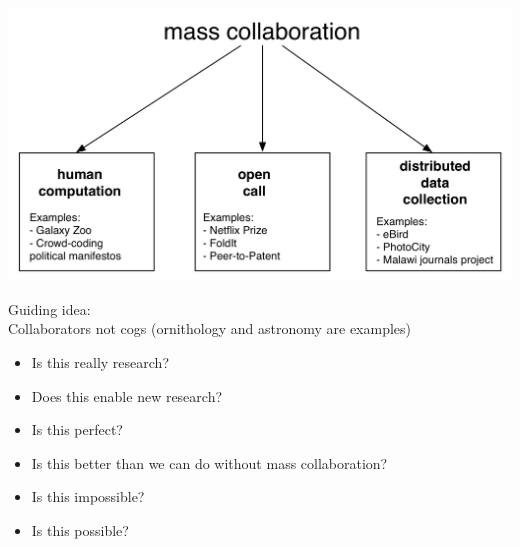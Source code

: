 \documentclass[aspectratio=169]{beamer}
\begin{document}
\begin{frame}

\begin{center}
\includegraphics[width=\textwidth]{figures/mass_collaboration_schematic}
\end{center}

\end{frame}
\begin{frame}

Guiding idea:\\
Collaborators not cogs (ornithology and astronomy are examples)

\end{frame}
\begin{frame}

\begin{itemize}
\item Is this really research?
\pause 
\item Does this enable new research?
\end{itemize}

\end{frame}
\begin{frame}

\begin{itemize}
\item Is this perfect?
\pause
\item Is this better than we can do without mass collaboration?
\end{itemize}

\end{frame}
\begin{frame}

\begin{itemize}
\item Is this impossible?
\pause
\item Is this possible?
\end{itemize}

\end{frame}
\end{document}
